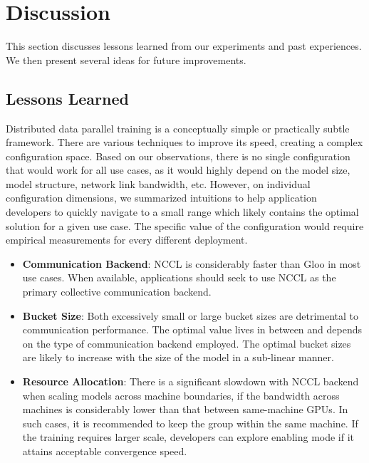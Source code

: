 \section{Discussion}\label{sec:discussion}

This section discusses lessons learned from our experiments and past experiences. We then present several ideas for future improvements. 

\subsection{Lessons Learned}

Distributed data parallel training is a conceptually simple or practically subtle framework. There are various techniques to improve its speed, creating a complex configuration space. Based on our observations, there is no single configuration that would work for all use cases, as it would highly depend on the model size, model structure, network link bandwidth, etc. However, on individual configuration dimensions, we summarized intuitions to help application developers to quickly navigate to a small range which likely contains the optimal solution for a given use case. The specific value of the configuration would require empirical measurements for every different deployment. 

\begin{itemize}
    \item \textbf{Communication Backend}: NCCL is considerably faster than Gloo in most use cases. When available, applications should seek to use NCCL as the primary collective communication backend.
    \item \textbf{Bucket Size}: Both excessively small or large bucket sizes are detrimental to communication performance. The optimal value lives in between and depends on the type of communication backend employed. The optimal bucket sizes are likely to increase with the size of the model in a sub-linear manner. 
    \item \textbf{Resource Allocation}: There is a significant slowdown with NCCL backend when scaling models across machine boundaries, if the bandwidth across machines is considerably lower than that between same-machine GPUs. In such cases, it is recommended to keep the  group within the same machine. If the training requires larger scale, developers can explore enabling  mode if it attains acceptable convergence speed. 
\end{itemize}

